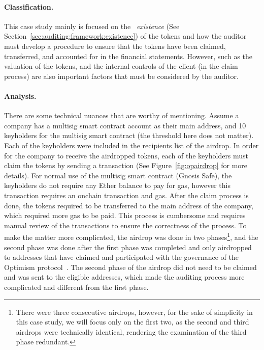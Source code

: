 \paragraph{Classification.} This case study mainly is focused on the ~\textit{existence} (See Section~\ref{sec:auditing:framework:existence}) of the tokens and how the auditor must develop a procedure to ensure that the tokens have been claimed, transferred, and accounted for in the financial statements. However, such as the valuation of the tokens, and the internal controls of the client (in the claim process) are also important factors that must be considered by the auditor.

\paragraph{Analysis.} 

There are some technical nuances that are worthy of mentioning. Assume a company has a multisig smart contract account as their main address, and 10 keyholders for the multisig smart contract (the threshold here does not matter). Each of the keyholders were included in the recipients list of the airdrop. In order for the company to receive the airdropped tokens, each of the keyholders must claim the tokens by sending a transaction (See Figure~\ref{fig:opairdrop} for more details). For normal use of the multisig smart contract (\eg Gnosis Safe), the keyholders do not require any Ether balance to pay for gas, however this transaction requires an onchain transaction and gas. After the claim process is done, the tokens required to be transferred to the main address of the company, which required more gas to be paid. This process is cumbersome and requires manual review of the transactions to ensure the correctness of the process. To make the matter more complicated, the airdrop was done in two phases\footnote{There were three consecutive airdrops, however, for the sake of simplicity in this case study, we will focus only on the first two, as the second and third airdrops were technically identical, rendering the examination of the third phase redundant.}, and the second phase was done after the first phase was completed and only airdropped to addresses that have claimed and participated with the governance of the Optimism protocol~\cite{allen2023airdrop}. The second phase of the airdrop did not need to be claimed and was sent to the eligible addresses, which made the auditing process more complicated and different from the first phase. 

